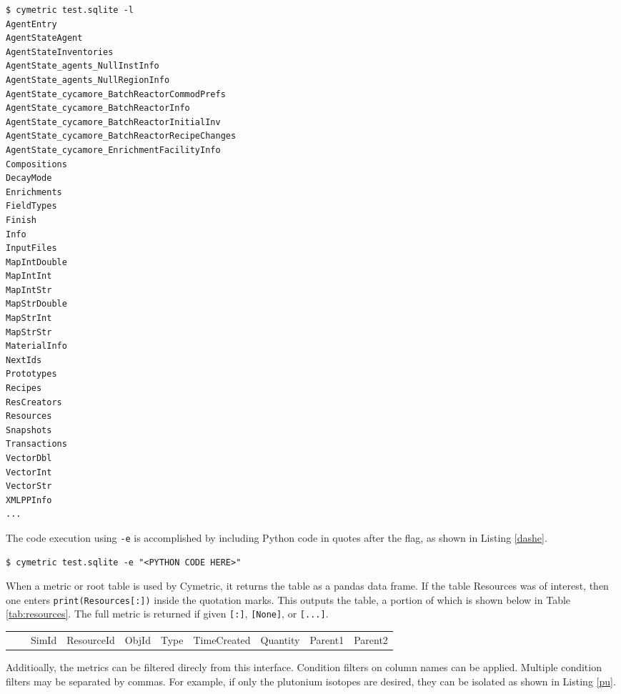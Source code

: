 \documentclass{anstrans}
\newcommand{\cyclus}{\textsc{Cyclus}\xspace}
\newcommand{\code}[1]{{\color{code}\texttt{#1}}}
\begin{document}
\begin{lstlisting}[caption ={List of Tables in a Database}, label=dashl]
$ cymetric test.sqlite -l
AgentEntry
AgentStateAgent
AgentStateInventories
AgentState_agents_NullInstInfo
AgentState_agents_NullRegionInfo
AgentState_cycamore_BatchReactorCommodPrefs
AgentState_cycamore_BatchReactorInfo
AgentState_cycamore_BatchReactorInitialInv
AgentState_cycamore_BatchReactorRecipeChanges
AgentState_cycamore_EnrichmentFacilityInfo
Compositions
DecayMode
Enrichments
FieldTypes
Finish
Info
InputFiles
MapIntDouble
MapIntInt
MapIntStr
MapStrDouble
MapStrInt
MapStrStr
MaterialInfo
NextIds
Prototypes
Recipes
ResCreators
Resources
Snapshots
Transactions
VectorDbl
VectorInt
VectorStr
XMLPPInfo
...
\end{lstlisting} 

The code execution using \code{-e} is accomplished by including 
Python code in quotes after the flag, as shown in Listing \ref{dashe}. 

\begin{lstlisting}[caption ={Executing Code on a Database}, label=dashe]
$ cymetric test.sqlite -e "<PYTHON CODE HERE>"
\end{lstlisting} 

When a metric or root table is used by Cymetric, it returns the table 
as a pandas data frame. \cite{pandas0.15.2} If the table Resources was of interest, 
then one enters \code{print(Resources[:])} inside the quotation marks. 
This outputs the table, a portion of which is shown below in Table 
\ref{tab:resources}. The full metric is returned if given \code{[:]}, 
\code{[None]}, or \code{[...]}. 

\begin{table*}[htb]
  \centering
\begin{tabular}{llllllllll}
      &       & SimId      & ResourceId      &
      ObjId      & Type      & TimeCreated      & Quantity      &
      Parent1      & Parent2
\\
\end{tabular}
  \caption{The Resources table in the \cyclus database.}
  \label{tab:resources}
\end{table*}

Additioally, the metrics can be filtered direcly from this interface.
Condition filters on column names can be applied. Multiple condition
filters may be separated by commas. For example, if only the plutonium 
isotopes are desired, they can be isolated as shown in Listing \ref{pu}. 
\end{document}
